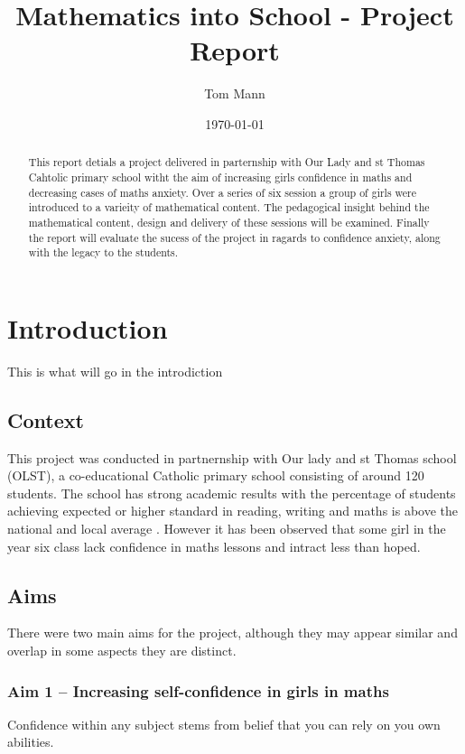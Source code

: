 \documentclass[11pt, a4paper, notitlepage]{article}
\title{Mathematics into School - Project Report}
\author{Tom Mann}
\date{\today}
\begin{document}
\maketitle

\begin{abstract}
    This report detials a project delivered in parternship with Our Lady and st Thomas Cahtolic primary school witht the aim of increasing girls confidence in maths and decreasing cases of maths anxiety. Over a series of six session a group of girls were introduced to a varieity of mathematical content. The pedagogical insight behind the mathematical content, design and delivery of these sessions will be examined. Finally the report will evaluate the sucess of the project in ragards to confidence anxiety, along with the legacy to the students.
\end{abstract}

\clearpage

\tableofcontents

\clearpage

\section{Introduction}
This is what will go in the introdiction

\subsection{Context}
This project was conducted in partnernship with Our lady and st Thomas school (OLST), a  co-educational Catholic primary school consisting of around 120 students. The school has strong academic results with the percentage of students achieving expected or higher standard in reading, writing and maths is above the national and local average \cite{OLST_stats}. However it has been observed that some girl in the year six class lack confidence in maths lessons and intract less than hoped.


\subsection{Aims}
There were two main aims for the project, although they may appear similar and overlap in some aspects they are distinct.

\subsubsection{Aim 1 -- Increasing self-confidence in girls in maths} 
Confidence within any subject stems from belief that you can rely on you own abilities. 
\end{document}
